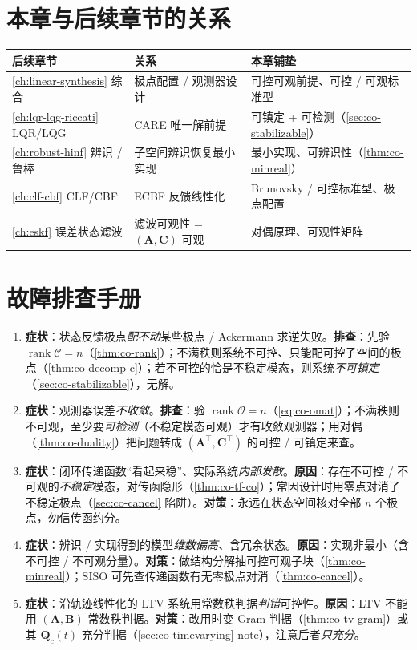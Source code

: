 \section*{本章与后续章节的关系}
\begin{table}[H]\centering\small
\begin{tabular}{lll}
\toprule
后续章节 & 关系 & 本章铺垫 \\
\midrule
\cref{ch:linear-synthesis} 综合 & 极点配置 / 观测器设计 & 可控可观前提、可控 / 可观标准型 \\
\cref{ch:lqr-lqg-riccati} LQR/LQG & CARE 唯一解前提 & 可镇定 + 可检测（\cref{sec:co-stabilizable}）\\
\cref{ch:robust-hinf} 辨识 / 鲁棒 & 子空间辨识恢复最小实现 & 最小实现、可辨识性（\cref{thm:co-minreal}）\\
\cref{ch:clf-cbf} CLF/CBF & ECBF 反馈线性化 & Brunovsky / 可控标准型、极点配置 \\
\cref{ch:eskf} 误差状态滤波 & 滤波可观性 = $(\mathbf{A},\mathbf{C})$ 可观 & 对偶原理、可观性矩阵 \\
\bottomrule
\end{tabular}
\end{table}

\section*{故障排查手册}
\begin{enumerate}
  \item \textbf{症状}：状态反馈极点\emph{配不动}某些极点 / Ackermann 求逆失败。\textbf{排查}：先验 $\operatorname{rank}\mathcal{C}=n$（\cref{thm:co-rank}）；不满秩则系统不可控、只能配可控子空间的极点（\cref{thm:co-decomp-c}）；若不可控的恰是不稳定模态，则系统\emph{不可镇定}（\cref{sec:co-stabilizable}），无解。
  \item \textbf{症状}：观测器误差\emph{不收敛}。\textbf{排查}：验 $\operatorname{rank}\mathcal{O}=n$（\cref{eq:co-omat}）；不满秩则不可观，至少要\emph{可检测}（不稳定模态可观）才有收敛观测器；用对偶（\cref{thm:co-duality}）把问题转成 $(\mathbf{A}^\top,\mathbf{C}^\top)$ 的可控 / 可镇定来查。
  \item \textbf{症状}：闭环传递函数“看起来稳”、实际系统\emph{内部发散}。\textbf{原因}：存在不可控 / 不可观的\emph{不稳定}模态，对传函隐形（\cref{thm:co-tf-co}）；常因设计时用零点对消了不稳定极点（\cref{sec:co-cancel} 陷阱）。\textbf{对策}：永远在状态空间核对全部 $n$ 个极点，勿信传函约分。
  \item \textbf{症状}：辨识 / 实现得到的模型\emph{维数偏高}、含冗余状态。\textbf{原因}：实现非最小（含不可控 / 不可观分量）。\textbf{对策}：做结构分解抽可控可观子块（\cref{thm:co-minreal}）；SISO 可先查传递函数有无零极点对消（\cref{thm:co-cancel}）。
  \item \textbf{症状}：沿轨迹线性化的 LTV 系统用常数秩判据\emph{判错}可控性。\textbf{原因}：LTV 不能用 $(\mathbf{A},\mathbf{B})$ 常数秩判据。\textbf{对策}：改用时变 Gram 判据（\cref{thm:co-tv-gram}）或其 $\mathbf{Q}_c(t)$ 充分判据（\cref{sec:co-timevarying} note），注意后者\emph{只充分}。
\end{enumerate}

